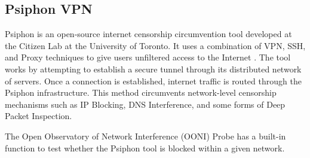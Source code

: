 \subsection{Psiphon VPN}

Psiphon is an open-source internet censorship circumvention tool developed at the Citizen Lab at the University of Toronto. It uses a combination of VPN, SSH, and Proxy techniques to give users unfiltered access to the Internet \cite{ooniPsiphonTest}. The tool works by attempting to establish a secure tunnel through its distributed network of servers. Once a connection is established, internet traffic is routed through the Psiphon infrastructure. This method circumvents network-level censorship mechanisms such as IP Blocking, DNS Interference, and some forms of Deep Packet Inspection. 

The Open Observatory of Network Interference (OONI) Probe has a built-in function to test whether the Psiphon tool is blocked within a given network.
